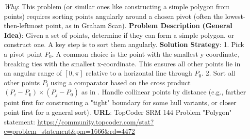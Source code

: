 \begin{problemexample}
\label{probex:A.4.2.tc_polygon_sort}
\textit{Why}: This problem (or similar ones like constructing a simple polygon from points) requires sorting points angularly around a chosen pivot (often the lowest-then-leftmost point, as in Graham Scan).
\textbf{Problem Description (General Idea)}: Given a set of points, determine if they can form a simple polygon, or construct one. A key step is to sort them angularly.
\textbf{Solution Strategy}:
1. Pick a pivot point $P_0$. A common choice is the point with the smallest y-coordinate, breaking ties with the smallest x-coordinate. This ensures all other points lie in an angular range of $[0, \pi]$ relative to a horizontal line through $P_0$.
2. Sort all other points $P_i$ using a comparator based on the cross product $(P_i - P_0) \times (P_j - P_0)$ as in . Handle collinear points by distance (e.g., farther point first for constructing a "tight" boundary for some hull variants, or closer point first for a general sort).
\textbf{URL}: TopCoder SRM 144 Problem "Polygon" statement: \url{https://community.topcoder.com/stat?c=problem_statement&pm=1666&rd=4472}
\end{problemexample}

